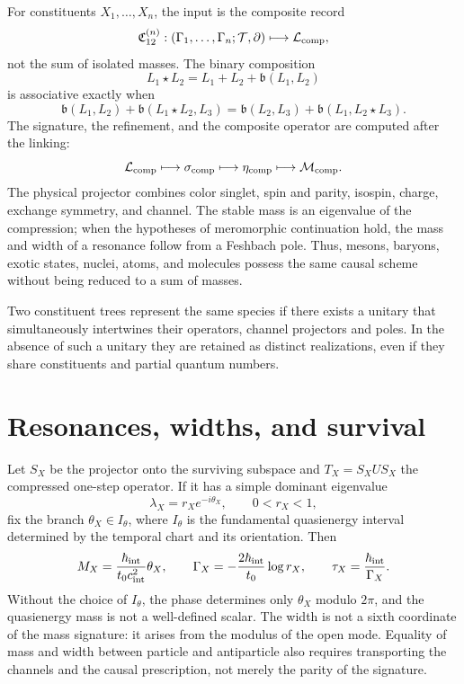 For constituents \(X_1,\ldots,X_n\), the input is the composite record
\[
 \mathfrak C_{12}^{(n)}:
 (\Gamma_1,\ldots,\Gamma_n;\mathcal T,\partial)
 \longmapsto\mathcal L_{\rm comp},
\]
not the sum of isolated masses. The binary composition
\[
 L_1\star L_2=L_1+L_2+\mathfrak b(L_1,L_2)
\]
is associative exactly when
\[
 \mathfrak b(L_1,L_2)+\mathfrak b(L_1\star L_2,L_3)
 =\mathfrak b(L_2,L_3)+\mathfrak b(L_1,L_2\star L_3).
\]
The signature, the refinement, and the composite operator are computed after the linking:
\[
 \mathcal L_{\rm comp}\longmapsto\sigma_{\rm comp}
 \longmapsto\eta_{\rm comp}\longmapsto\mathcal M_{\rm comp}.
\]
The physical projector combines color singlet, spin and parity, isospin, charge,
exchange symmetry, and channel. The stable mass is an eigenvalue of the
compression; when the hypotheses of meromorphic continuation hold, the mass
and width of a resonance follow from a Feshbach pole. Thus,
mesons, baryons, exotic states, nuclei, atoms, and
molecules possess the same causal scheme without being reduced to a sum of masses.

Two constituent trees represent the same species if there exists a
unitary that simultaneously intertwines their operators, channel projectors and
poles. In the absence of such a unitary they are retained as distinct realizations,
even if they share constituents and partial quantum numbers.

\section{Resonances, widths, and survival}

Let \(S_X\) be the projector onto the surviving subspace and
\(T_X=S_X U S_X\) the compressed one-step operator. If it has a simple dominant
eigenvalue
\[
 \lambda_X=r_X e^{-i\theta_X},\qquad 0<r_X<1,
\]
fix the branch \(\theta_X\in I_\theta\), where \(I_\theta\) is the fundamental
quasienergy interval determined by the temporal chart and its orientation.
Then
\[
 M_X=\frac{\hbar_{\rm int}}{t_0c_{\rm int}^2}\theta_X,
 \qquad
 \Gamma_X=-\frac{2\hbar_{\rm int}}{t_0}\log r_X,
 \qquad
 \tau_X=\frac{\hbar_{\rm int}}{\Gamma_X}.
\]
Without the choice of \(I_\theta\), the phase determines only \(\theta_X\) modulo
\(2\pi\), and the quasienergy mass is not a well-defined scalar.
The width is not a sixth coordinate of the mass signature: it arises from the modulus
of the open mode. Equality of mass and width between particle and
antiparticle also requires transporting the channels and the causal prescription, not merely
the parity of the signature.

